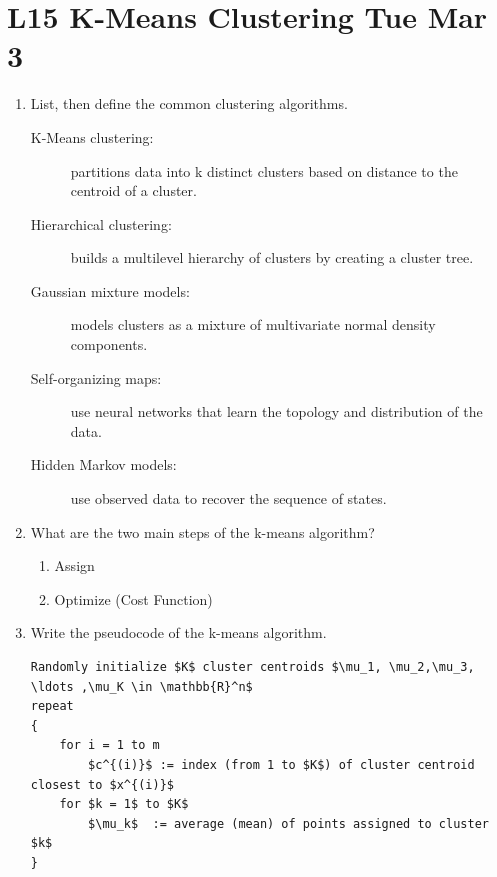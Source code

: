 \documentclass[12pt]{article}
\newenvironment{QandA}{\begin{enumerate}[label=\bfseries\arabic*.]\bfseries}
{\end{enumerate}}
\newenvironment{answered}{\par\normalfont\color{Sepia}}{}
\begin{document}
\section*{L15 K-Means Clustering \textemdash{} Tue Mar 3}
\begin{QandA}
    \item List, then define the common clustering algorithms.
    \begin{answered}
        \begin{description}
            \item[K-Means clustering:] partitions data into k distinct clusters based on distance to the centroid of a cluster.
            \item[Hierarchical clustering:] builds a multilevel hierarchy of clusters by creating a cluster tree.
            \item[Gaussian mixture models:] models clusters as a mixture of multivariate normal density components.
            \item[Self-organizing maps:] use neural networks that learn the topology and distribution of the data.
            \item[Hidden Markov models:] use observed data to recover the sequence of states.
        \end{description}
    \end{answered}


    \item What are the two main steps of the k-means algorithm? 
    \begin{answered}
        \begin{enumerate}
            \item Assign
            \item Optimize (Cost Function)
        \end{enumerate}
    \end{answered}

    \item Write the pseudocode of the k-means algorithm.
    \begin{answered}
        \begin{lstlisting}
Randomly initialize $K$ cluster centroids $\mu_1, \mu_2,\mu_3, \ldots ,\mu_K \in \mathbb{R}^n$
repeat 
{ 
    for i = 1 to m
        $c^{(i)}$ := index (from 1 to $K$) of cluster centroid closest to $x^{(i)}$
    for $k = 1$ to $K$
        $\mu_k$  := average (mean) of points assigned to cluster $k$
}
        \end{lstlisting}
    \end{answered}


\end{QandA}
\end{document}
